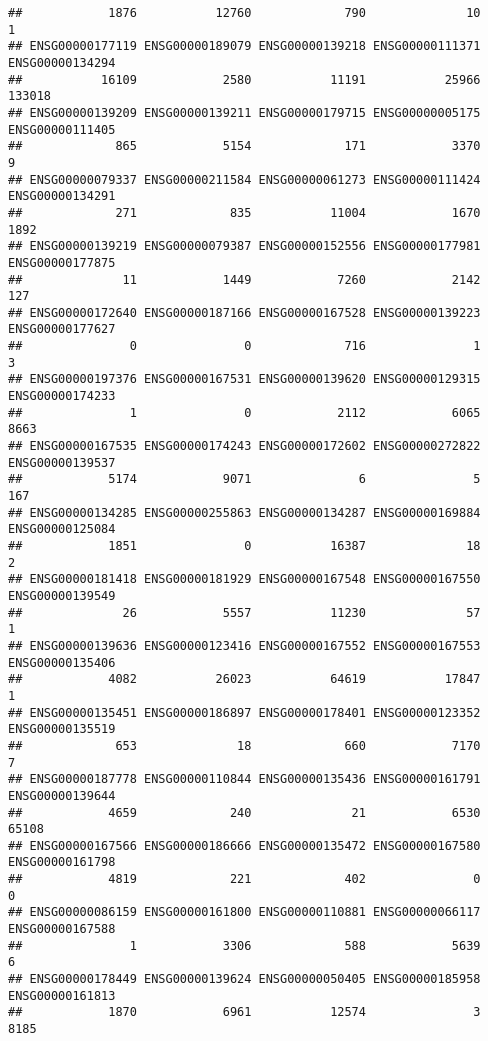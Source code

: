 \documentclass[
]{article}
\begin{document}
\begin{verbatim}
##            1876           12760             790              10               1 
## ENSG00000177119 ENSG00000189079 ENSG00000139218 ENSG00000111371 ENSG00000134294 
##           16109            2580           11191           25966          133018 
## ENSG00000139209 ENSG00000139211 ENSG00000179715 ENSG00000005175 ENSG00000111405 
##             865            5154             171            3370               9 
## ENSG00000079337 ENSG00000211584 ENSG00000061273 ENSG00000111424 ENSG00000134291 
##             271             835           11004            1670            1892 
## ENSG00000139219 ENSG00000079387 ENSG00000152556 ENSG00000177981 ENSG00000177875 
##              11            1449            7260            2142             127 
## ENSG00000172640 ENSG00000187166 ENSG00000167528 ENSG00000139223 ENSG00000177627 
##               0               0             716               1               3 
## ENSG00000197376 ENSG00000167531 ENSG00000139620 ENSG00000129315 ENSG00000174233 
##               1               0            2112            6065            8663 
## ENSG00000167535 ENSG00000174243 ENSG00000172602 ENSG00000272822 ENSG00000139537 
##            5174            9071               6               5             167 
## ENSG00000134285 ENSG00000255863 ENSG00000134287 ENSG00000169884 ENSG00000125084 
##            1851               0           16387              18               2 
## ENSG00000181418 ENSG00000181929 ENSG00000167548 ENSG00000167550 ENSG00000139549 
##              26            5557           11230              57               1 
## ENSG00000139636 ENSG00000123416 ENSG00000167552 ENSG00000167553 ENSG00000135406 
##            4082           26023           64619           17847               1 
## ENSG00000135451 ENSG00000186897 ENSG00000178401 ENSG00000123352 ENSG00000135519 
##             653              18             660            7170               7 
## ENSG00000187778 ENSG00000110844 ENSG00000135436 ENSG00000161791 ENSG00000139644 
##            4659             240              21            6530           65108 
## ENSG00000167566 ENSG00000186666 ENSG00000135472 ENSG00000167580 ENSG00000161798 
##            4819             221             402               0               0 
## ENSG00000086159 ENSG00000161800 ENSG00000110881 ENSG00000066117 ENSG00000167588 
##               1            3306             588            5639               6 
## ENSG00000178449 ENSG00000139624 ENSG00000050405 ENSG00000185958 ENSG00000161813 
##            1870            6961           12574               3            8185 

\end{verbatim}
\end{document}
